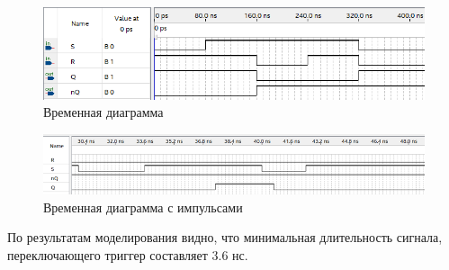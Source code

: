 \documentclass[a4paper,12pt]{article}
\begin{document}
    \begin{figure}[H]
		\centering
		\includegraphics[width=\linewidth]{polytech/scheme/report-lab3/subfiles/images/wave-1}
		\caption{Временная диаграмма}
		\label{fig:wave-1}
	\end{figure}

    \begin{figure}[H]
		\centering
		\includegraphics[width=\linewidth]{polytech/scheme/report-lab3/subfiles/images/wave-1-2}
		\caption{Временная диаграмма с импульсами}
		\label{fig:wave-1-2}
	\end{figure}
    По результатам моделирования видно, что минимальная длительность сигнала, переключающего триггер
    составляет $3.6$ нс.
\end{document}
